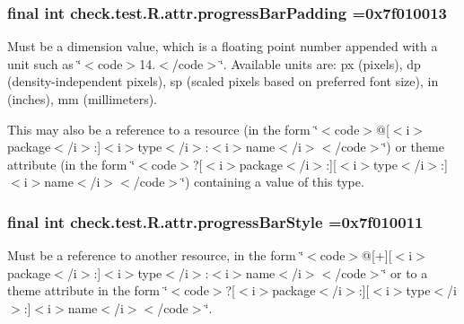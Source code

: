 \subsubsection[{progress\+Bar\+Padding}]{\setlength{\rightskip}{0pt plus 5cm}final int check.\+test.\+R.\+attr.\+progress\+Bar\+Padding =0x7f010013\hspace{0.3cm}{\ttfamily [static]}}\label{classcheck_1_1test_1_1_r_1_1attr_a48d0f556721f22983ce0941643a36463}
Must be a dimension value, which is a floating point number appended with a unit such as \char`\"{}$<$code$>$14.\+5sp$<$/code$>$\char`\"{}. Available units are\+: px (pixels), dp (density-\/independent pixels), sp (scaled pixels based on preferred font size), in (inches), mm (millimeters). 

This may also be a reference to a resource (in the form \char`\"{}$<$code$>$@\mbox{[}$<$i$>$package$<$/i$>$\+:\mbox{]}$<$i$>$type$<$/i$>$\+:$<$i$>$name$<$/i$>$$<$/code$>$\char`\"{}) or theme attribute (in the form \char`\"{}$<$code$>$?\mbox{[}$<$i$>$package$<$/i$>$\+:\mbox{]}\mbox{[}$<$i$>$type$<$/i$>$\+:\mbox{]}$<$i$>$name$<$/i$>$$<$/code$>$\char`\"{}) containing a value of this type. \hypertarget{classcheck_1_1test_1_1_r_1_1attr_afe708c30f6626b84484aba801cab4255}{}
\subsubsection[{progress\+Bar\+Style}]{\setlength{\rightskip}{0pt plus 5cm}final int check.\+test.\+R.\+attr.\+progress\+Bar\+Style =0x7f010011\hspace{0.3cm}{\ttfamily [static]}}\label{classcheck_1_1test_1_1_r_1_1attr_afe708c30f6626b84484aba801cab4255}
Must be a reference to another resource, in the form \char`\"{}$<$code$>$@\mbox{[}+\mbox{]}\mbox{[}$<$i$>$package$<$/i$>$\+:\mbox{]}$<$i$>$type$<$/i$>$\+:$<$i$>$name$<$/i$>$$<$/code$>$\char`\"{} or to a theme attribute in the form \char`\"{}$<$code$>$?\mbox{[}$<$i$>$package$<$/i$>$\+:\mbox{]}\mbox{[}$<$i$>$type$<$/i$>$\+:\mbox{]}$<$i$>$name$<$/i$>$$<$/code$>$\char`\"{}. \hypertarget{classcheck_1_1test_1_1_r_1_1attr_af0a91bf09811eeb964bf4bbeda503819}{}
